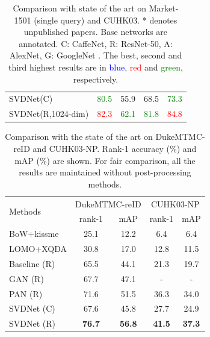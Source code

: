 \documentclass[10pt,twocolumn,letterpaper]{article}
\begin{document}
\begin{table}[t]
\begin{center}
\begin{tabular}{l|cc|cc}
SVDNet(C)     &\textcolor{green}{80.5}&55.9      &68.5&\textcolor{green}{73.3}\\
SVDNet(R,1024-dim)&\textcolor{red}{82.3}&\textcolor{green}{62.1}     &\textcolor{green}{81.8}&\textcolor{red}{84.8}\\
\hline
\end{tabular}
\end{center}
\setlength{\abovecaptionskip}{-0cm} 
\caption{Comparison with state of the art on Market-1501 (single query) and CUHK03. * denotes unpublished papers. Base networks are annotated. C: CaffeNet, R: ResNet-50, A: AlexNet, G: GoogleNet \cite{szegedy2015going}. The best, second and third highest results are in \textcolor{blue}{blue}, \textcolor{red}{red} and \textcolor{green}{green}, respectively.}
\label{table:sota-market}
\end{table}

\begin{table}
\begin{center}
\begin{tabular}{l|cc|cc}
\hline
\multicolumn{1}{l|}{\multirow{2}{*}{Methods}}&\multicolumn{2}{c|}{DukeMTMC-reID}&\multicolumn{2}{c}{CUHK03-NP}\\
\cline{2-5}
\multicolumn{1}{c|}{}&rank-1&mAP&rank-1&mAP\\
\hline
BoW+kissme \cite{DBLP:conf/iccv/ZhengSTWWT15} & 25.1 & 12.2 & 6.4 & 6.4\\
LOMO+XQDA \cite{DBLP:conf/cvpr/LiaoHZL15} & 30.8 & 17.0 & 12.8 & 11.5 \\
Baseline (R) & 65.5 & 44.1 & 21.3 & 19.7 \\ 
GAN (R) \cite{zheng2017unlabeled} & {67.7}  & {47.1} & - & - \\
PAN (R) \cite{DBLP:journals/corr/PAN} & 71.6& 51.5 & 36.3 &34.0\\
\hline
SVDNet (C) &67.6&45.8 &27.7 & 24.9 \\
SVDNet (R) &\textbf{76.7}& \textbf{56.8} & \textbf{41.5} & \textbf{37.3} \\
\hline
\end{tabular}
\end{center}
\setlength{\abovecaptionskip}{0cm} 
\setlength{\belowcaptionskip}{0pt} 
\caption{Comparison with the state of the art on DukeMTMC-reID and CUHK03-NP. Rank-1 accuracy (\%) and mAP (\%) are shown. For fair comparison, all the results are maintained without post-processing methods.}
\label{table:duke}
\end{table}
\end{document}
